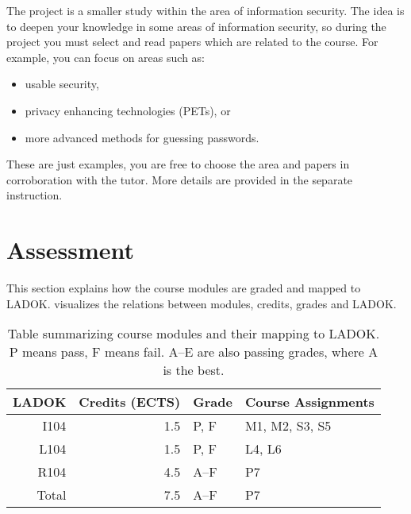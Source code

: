 The project is a smaller study within the area of information security.
The idea is to deepen your knowledge in some areas of information security, so 
during the project you must select and read papers which are related to the 
course.
For example, you can focus on areas such as:
\begin{itemize}
  \item usable security,
  \item privacy enhancing technologies (PETs), or
  \item more advanced methods for guessing passwords.
\end{itemize}
These are just examples, you are free to choose the area and papers in 
corroboration with the tutor.
More details are provided in the separate instruction.


\section{Assessment}%
\label{Assessment}


This section explains how the course modules are graded and mapped to LADOK\@.
 visualizes the relations between modules, credits, grades and 
LADOK\@.

\begin{frame}
\begin{table}
  \centering
  \setlength{\tabcolsep}{0.5em}
  \begin{tabular}{r r l l}
    \toprule
    LADOK & Credits (ECTS)  & Grade       & Course Assignments\\
    \midrule
    I104  & 1.5             & P, F        & M1, M2, S3, S5\\
    L104  & 1.5             & P, F        & L4, L6\\
    R104  & 4.5             & A--F        & P7\\
    \midrule
    Total & 7.5             & A--F        & P7\\
    \bottomrule
  \end{tabular}
  \caption{%
    Table summarizing course modules and their mapping to LADOK\@.
    P means pass, F means fail.
    A--E are also passing grades, where A is the best.
  }\label{LADOKTable}
\end{table}
\end{frame}


